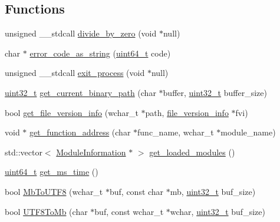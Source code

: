 \subsection*{Functions}
\begin{DoxyCompactItemize}
\item 
unsigned \-\_\-\-\_\-stdcall \hyperlink{utils_8cc_af447d208726a022a2c413ca6ae5dc189}{divide\-\_\-by\-\_\-zero} (void $\ast$null)
\item 
char $\ast$ \hyperlink{utils_8cc_a138b647135011ac5c1be76ca1ee502b3}{error\-\_\-code\-\_\-as\-\_\-string} (\hyperlink{stdint_8h_aaa5d1cd013383c889537491c3cfd9aad}{uint64\-\_\-t} code)
\item 
unsigned \-\_\-\-\_\-stdcall \hyperlink{utils_8cc_a19072a21aa14204c101b56310a053f00}{exit\-\_\-process} (void $\ast$null)
\item 
\hyperlink{stdint_8h_a435d1572bf3f880d55459d9805097f62}{uint32\-\_\-t} \hyperlink{utils_8cc_aeed751e935810eb5bfdbcffbb9013c13}{get\-\_\-current\-\_\-binary\-\_\-path} (char $\ast$buffer, \hyperlink{stdint_8h_a435d1572bf3f880d55459d9805097f62}{uint32\-\_\-t} buffer\-\_\-size)
\item 
bool \hyperlink{utils_8cc_afb234253fc6ab388ccb09dd11b577ec5}{get\-\_\-file\-\_\-version\-\_\-info} (wchar\-\_\-t $\ast$path, \hyperlink{structfile__version__info}{file\-\_\-version\-\_\-info} $\ast$fvi)
\item 
void $\ast$ \hyperlink{utils_8cc_a74f3dd1eda7408b43f7f7fb41465833c}{get\-\_\-function\-\_\-address} (char $\ast$func\-\_\-name, wchar\-\_\-t $\ast$module\-\_\-name)
\item 
std\-::vector$<$ \hyperlink{struct_module_information}{Module\-Information} $\ast$ $>$ \hyperlink{utils_8cc_afe432f244cf72a14501d60454fdf4ebf}{get\-\_\-loaded\-\_\-modules} ()
\item 
\hyperlink{stdint_8h_aaa5d1cd013383c889537491c3cfd9aad}{uint64\-\_\-t} \hyperlink{utils_8cc_a42ad066921539506df198aebf42ff28d}{get\-\_\-ms\-\_\-time} ()
\item 
bool \hyperlink{utils_8cc_a5cdc599d3bbb0d0cbd517c7747a69ab7}{Mb\-To\-U\-T\-F8} (wchar\-\_\-t $\ast$buf, const char $\ast$mb, \hyperlink{stdint_8h_a435d1572bf3f880d55459d9805097f62}{uint32\-\_\-t} buf\-\_\-size)
\item 
bool \hyperlink{utils_8cc_a73d99db62cbee3295fa98c3489ac9471}{U\-T\-F8\-To\-Mb} (char $\ast$buf, const wchar\-\_\-t $\ast$wchar, \hyperlink{stdint_8h_a435d1572bf3f880d55459d9805097f62}{uint32\-\_\-t} buf\-\_\-size)
\item 

\end{DoxyCompactItemize}
